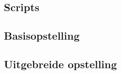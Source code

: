 \chapter{}%
\label{ch:resultaten}

\section{Scripts}

\section{Basisopstelling}

\section{Uitgebreide opstelling}